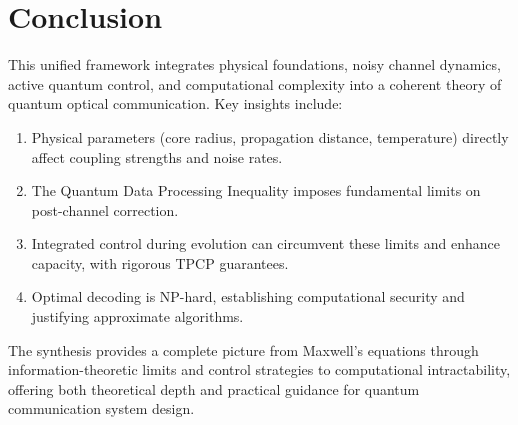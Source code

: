 \documentclass[12pt]{article}
\begin{document}
\section*{Conclusion}

This unified framework integrates physical foundations, noisy channel dynamics, active quantum control, and computational complexity into a coherent theory of quantum optical communication. Key insights include:
\begin{enumerate}
    \item Physical parameters (core radius, propagation distance, temperature) directly affect coupling strengths and noise rates.
    \item The Quantum Data Processing Inequality imposes fundamental limits on post-channel correction.
    \item Integrated control during evolution can circumvent these limits and enhance capacity, with rigorous TPCP guarantees.
    \item Optimal decoding is NP-hard, establishing computational security and justifying approximate algorithms.
\end{enumerate}
The synthesis provides a complete picture from Maxwell's equations through information-theoretic limits and control strategies to computational intractability, offering both theoretical depth and practical guidance for quantum communication system design.
\end{document}
